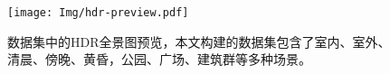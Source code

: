\begin{figure}[!htbp]
  \centering
  \texttt{[image: Img/hdr-preview.pdf]}
  \caption[光照估计数据集预览]{
    \label{fig:hdr-preview}
    数据集中的HDR全景图预览，本文构建的数据集包含了室内、室外、清晨、傍晚、黄昏，公园、广场、建筑群等多种场景。
  }
\end{figure}